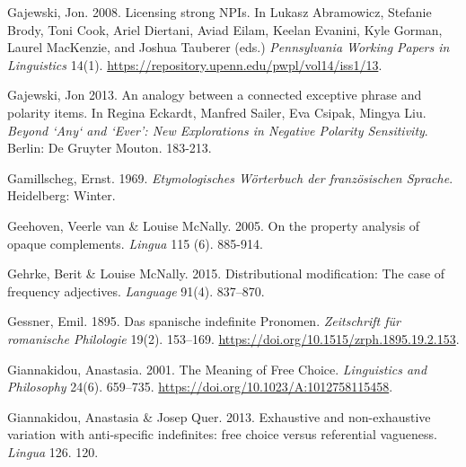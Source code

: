 \begin{styleStandard}
Gajewski, Jon. 2008. Licensing strong NPIs. In Lukasz Abramowicz, Stefanie Brody, Toni Cook, Ariel Diertani, Aviad Eilam, Keelan Evanini, Kyle Gorman, Laurel MacKenzie, and Joshua Tauberer (eds.) \textit{Pennsylvania Working Papers in Linguistics} 14(1). \url{https://repository.upenn.edu/pwpl/vol14/iss1/13}.
\end{styleStandard}

\begin{styleStandard}
Gajewski, Jon 2013. An analogy between a connected exceptive phrase and polarity items. In Regina Eckardt, Manfred Sailer, Eva Csipak, Mingya Liu. \textit{Beyond ‘Any‘ and ‘Ever’: New Explorations in Negative Polarity Sensitivity}. Berlin: De Gruyter Mouton. 183-213.
\end{styleStandard}

\begin{styleStandard}
Gamillscheg, Ernst. 1969. \textit{Etymologisches Wörterbuch der französischen Sprache}. Heidelberg: Winter.
\end{styleStandard}

\begin{styleStandard}
Geehoven, Veerle van \& Louise McNally. 2005. On the property analysis of opaque complements. \textit{Lingua} 115 (6). 885-914. 
\end{styleStandard}

\begin{styleStandard}
Gehrke, Berit \& Louise McNally. 2015. Distributional modification: The case of frequency adjectives. \textit{Language} 91(4). 837–870.
\end{styleStandard}

\begin{styleStandard}
Gessner, Emil. 1895. Das spanische indefinite Pronomen. \textit{Zeitschrift für romanische Philologie} 19(2). 153–169. \url{https://doi.org/10.1515/zrph.1895.19.2.153}.
\end{styleStandard}

\begin{styleStandard}
Giannakidou, Anastasia. 2001. The Meaning of Free Choice. \textit{Linguistics and Philosophy} 24(6). 659–735. \url{https://doi.org/10.1023/A:1012758115458}.
\end{styleStandard}

\begin{styleStandard}
Giannakidou, Anastasia \& Josep Quer. 2013. Exhaustive and non-exhaustive variation with anti-specific indefinites: free choice versus referential vagueness. \textit{Lingua} 126. 120.
\end{styleStandard}

